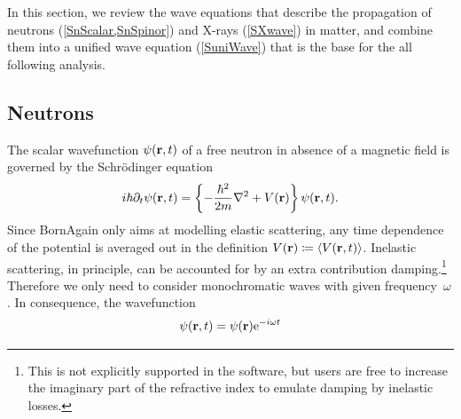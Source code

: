 In this section, we review the wave equations that describe the propagation
of neutrons (\cref{SnScalar,SnSpinor}) and X-rays (\cref{SXwave}) in matter,
and combine them into a unified wave equation (\cref{SuniWave})
that is the base for the all following analysis.

\subsection{Neutrons}\label{SnScalar}
%
%

\def\Vmac{\tilde{V}}

%
The scalar wavefunction $\psi(\mathbf{r},t)$
%
%
%
of a free neutron
in absence of a magnetic field
is governed by the Schrödinger equation
\begin{equation}\label{ESchrodi1}
  i\hbar\partial_t \psi(\mathbf{r},t)
  = \left\{-\frac{\hbar^2}{2m}\mathbf{\nabla}^2+V(\mathbf{r})\right\} \psi(\mathbf{r},t).
\end{equation}
Since BornAgain only aims at modelling elastic scattering,
%
any time dependence of the potential is averaged out in the definition
%
%
$V(\mathbf{r})\coloneqq \langle V(\mathbf{r},t)\rangle$.
%
%
Inelastic scattering,
%
%
%
%
in principle, can be accounted for by an extra contribution
damping.\footnote
{This is not explicitly supported in the software,
but users are free to increase the imaginary part of the refractive index
%
to emulate damping by inelastic losses.\label{Flosses}}
Therefore we only need to consider monochromatic waves
%
%
with given frequency~$\omega$.
%
In consequence, the wavefunction
\begin{equation}\label{Estationarywave}
  \psi(\mathbf{r},t) = \psi(\mathbf{r})\mathrm e^{-i\omega t}
\end{equation}
